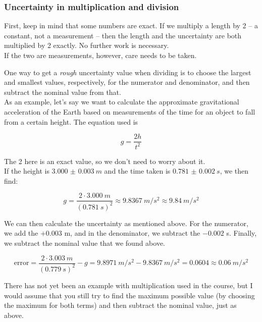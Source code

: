\documentclass[12pt,a4paper]{report}
\begin{document}
\subsubsection{Uncertainty in multiplication and division}

First, keep in mind that some numbers are exact. If we multiply a length by 2 -- a constant, not a measurement -- then the length and the uncertainty are both multiplied by 2 exactly. No further work is necessary.\\
If the two are measurements, however, care needs to be taken.

One way to get a \emph{rough} uncertainty value when dividing is to choose the largest and smallest values, respectively, for the numerator and denominator, and then subtract the nominal value from that.\\
As an example, let's say we want to calculate the approximate gravitational acceleration of the Earth based on measurements of the time for an object to fall from a certain height. The equation used is

\begin{equation}
 g = \frac{2 h}{t^2}
\end{equation}

The 2 here is an exact value, so we don't need to worry about it.\\
If the height is $\SI{3.000(3)}{m}$ and the time taken is $\SI{0.781(2)}{s}$, we then find:

\begin{equation}
g = \frac{2\cdot\SI{3.000}{m}}{(\SI{0.781}{s})^2} \approx \SI{9.8367}{m/s^2} \approx \SI{9.84}{m/s^2}
\end{equation}

We can then calculate the uncertainty as mentioned above. For the numerator, we add the $+ 0.003$ m, and in the denominator, we subtract the $- 0.002$ s. Finally, we subtract the nominal value that we found above.

\begin{equation}
\text{error} = \frac{2 \cdot \SI{3.003}{m}}{(\SI{0.779}{s})^2} - g = \SI{9.8971}{m/s^2} - \SI{9.8367}{m/s^2} = 0.0604 \approx \SI{0.06}{m/s^2}
\end{equation}

There has not yet been an example with multiplication used in the course, but I would assume that you still try to find the maximum possible value (by choosing the maximum for both terms) and then subtract the nominal value, just as above.
\end{document}
